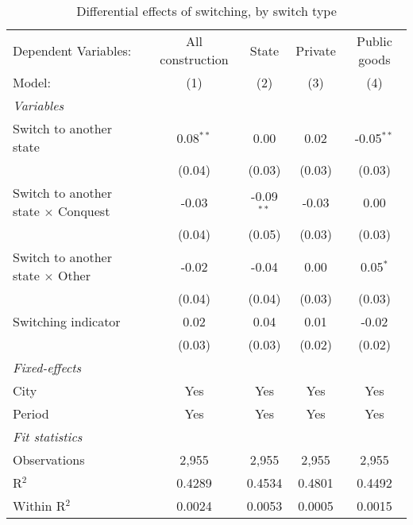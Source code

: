 \begin{table}[htbp]
   \caption{\label{tab:baseline_100y} Differential effects of switching, by switch type}
   \centering
   \begin{tabular}{lcccc}
      \tabularnewline \midrule \midrule
      Dependent Variables:                       & All construction & State        & Private & Public goods\\  
      Model:                                     & (1)              & (2)          & (3)     & (4)\\  
      \midrule
      \emph{Variables}\\
      Switch to another state                    & 0.08$^{**}$      & 0.00         & 0.02    & -0.05$^{**}$\\   
                                                 & (0.04)           & (0.03)       & (0.03)  & (0.03)\\   
      Switch to another state $\times$ Conquest  & -0.03            & -0.09$^{**}$ & -0.03   & 0.00\\   
                                                 & (0.04)           & (0.05)       & (0.03)  & (0.03)\\   
      Switch to another state $\times$ Other     & -0.02            & -0.04        & 0.00    & 0.05$^{*}$\\   
                                                 & (0.04)           & (0.04)       & (0.03)  & (0.03)\\   
      Switching indicator                        & 0.02             & 0.04         & 0.01    & -0.02\\   
                                                 & (0.03)           & (0.03)       & (0.02)  & (0.02)\\   
      \midrule
      \emph{Fixed-effects}\\
      City                                       & Yes              & Yes          & Yes     & Yes\\  
      Period                                     & Yes              & Yes          & Yes     & Yes\\  
      \midrule
      \emph{Fit statistics}\\
      Observations                               & 2,955            & 2,955        & 2,955   & 2,955\\  
      R$^2$                                      & 0.4289           & 0.4534       & 0.4801  & 0.4492\\  
      Within R$^2$                               & 0.0024           & 0.0053       & 0.0005  & 0.0015\\  
      \midrule \midrule
      

\end{tabular}
\end{table}
